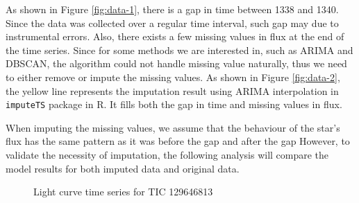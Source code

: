\documentclass[
]{article}
\begin{document}
As shown in Figure \ref{fig:data-1}, there is a gap in time between 1338 and 1340. Since the data was collected over a regular time interval, such gap may due to instrumental errors. Also, there exists a few missing values in flux at the end of the time series. Since for some methods we are interested in, such as ARIMA and DBSCAN, the algorithm could not handle missing value naturally, thus we need to either remove or impute the missing values. As shown in Figure \ref{fig:data-2}, the yellow line represents the imputation result using ARIMA interpolation in \texttt{imputeTS} package in R. It fills both the gap in time and missing values in flux.

When imputing the missing values, we assume that the behaviour of the star's flux has the same pattern as it was before the gap and after the gap However, to validate the necessity of imputation, the following analysis will compare the model results for both imputed data and original data.

\begin{figure}[H]

{\centering {}

}

\caption{Light curve time series for TIC 129646813}\label{fig:data}
\end{figure}
\end{document}
